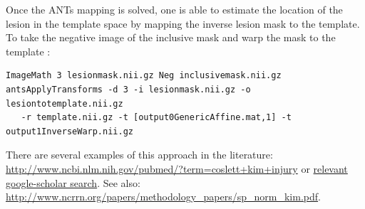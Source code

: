 \documentclass{InsightArticle}
\begin{document}
Once the ANTs mapping is solved, 
one is able to estimate the location of the lesion in the template space by mapping the inverse lesion mask to the template.
To take the negative image of the inclusive mask 
and warp the mask to the template :
\begin{verbatim}
ImageMath 3 lesionmask.nii.gz Neg inclusivemask.nii.gz
antsApplyTransforms -d 3 -i lesionmask.nii.gz -o lesiontotemplate.nii.gz 
   -r template.nii.gz -t [output0GenericAffine.mat,1] -t output1InverseWarp.nii.gz
\end{verbatim}
There are several examples of this approach in the literature:
\href{http://www.ncbi.nlm.nih.gov/pubmed/?term=coslett+kim+injury}{http://www.ncbi.nlm.nih.gov/pubmed/?term=coslett+kim+injury}
or
\href{http://scholar.google.com/scholar?q=brain+normalization+MRI+ANTs+advanced+lesion+tools+-ant&btnG=&hl=en&as_sdt=0%2C39}{relevant google-scholar search}.
See also: \href{http://www.ncrrn.org/papers/methodology\_papers/sp\_norm\_kim.pdf}{http://www.ncrrn.org/papers/methodology\_papers/sp\_norm\_kim.pdf}.
\end{document}
